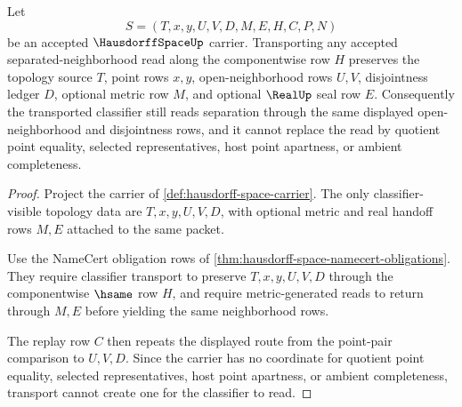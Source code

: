 \begin{theorem}
\label{thm:hausdorff-space-open-neighborhood-classifier-transport}
Let
$$
S=(T,x,y,U,V,D,M,E,H,C,P,N)
$$
be an accepted $\HausdorffSpaceUp$ carrier. Transporting any accepted separated-neighborhood read along the componentwise row $H$ preserves the topology source $T$, point rows $x,y$, open-neighborhood rows $U,V$, disjointness ledger $D$, optional metric row $M$, and optional $\RealUp$ seal row $E$. Consequently the transported classifier still reads separation through the same displayed open-neighborhood and disjointness rows, and it cannot replace the read by quotient point equality, selected representatives, host point apartness, or ambient completeness.
\end{theorem}
\begin{proof}
Project the carrier of \autoref{def:hausdorff-space-carrier}. The only classifier-visible topology data are $T,x,y,U,V,D$, with optional metric and real handoff rows $M,E$ attached to the same packet.

Use the NameCert obligation rows of \autoref{thm:hausdorff-space-namecert-obligations}. They require classifier transport to preserve $T,x,y,U,V,D$ through the componentwise $\hsame$ row $H$, and require metric-generated reads to return through $M,E$ before yielding the same neighborhood rows.

The replay row $C$ then repeats the displayed route from the point-pair comparison to $U,V,D$. Since the carrier has no coordinate for quotient point equality, selected representatives, host point apartness, or ambient completeness, transport cannot create one for the classifier to read.
\end{proof}

